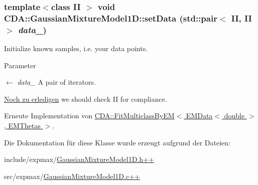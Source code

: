 \hypertarget{classCDA_1_1GaussianMixtureModel1D_ada5a646f31d12697bc0fc66934a54dab}{
\subsubsection[{setData}]{\setlength{\rightskip}{0pt plus 5cm}template$<$class II $>$ void CDA::GaussianMixtureModel1D::setData (std::pair$<$ II, II $>$ {\em data\_\-})}}
\label{classCDA_1_1GaussianMixtureModel1D_ada5a646f31d12697bc0fc66934a54dab}


Initialize known samples, i.e. your data points. 


\begin{DoxyParams}{Parameter}
\item[\mbox{$\leftarrow$} {\em data\_\-}]A pair of iterators. \end{DoxyParams}
\begin{Desc}
\item[\hyperlink{todo__todo000005}{Noch zu erledigen}]we should check II for compliance. \end{Desc}


Erneute Implementation von \hyperlink{classCDA_1_1FitMulticlassByEM_a7247bfcad3c828f9cf372b6c414e93f0}{CDA::FitMulticlassByEM$<$ EMData$<$ double $>$, EMThetas $>$}.



Die Dokumentation für diese Klasse wurde erzeugt aufgrund der Dateien:\begin{DoxyCompactItemize}
\item 
include/expmax/\hyperlink{GaussianMixtureModel1D_8h_09_09}{GaussianMixtureModel1D.h++}\item 
src/expmax/\hyperlink{GaussianMixtureModel1D_8c_09_09}{GaussianMixtureModel1D.c++}\end{DoxyCompactItemize}
